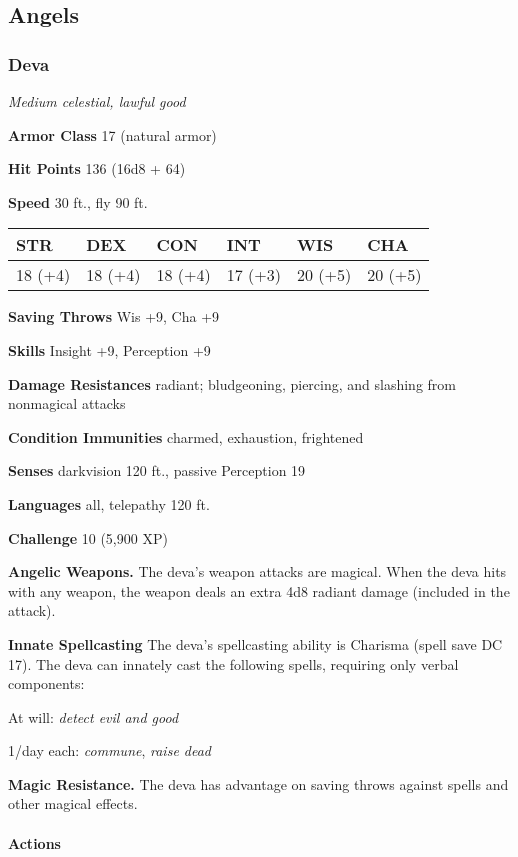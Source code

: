 \documentclass[
]{article}
\begin{document}
\hypertarget{angels}{%
\subsection{Angels}\label{angels}}

\hypertarget{deva}{%
\subsubsection{Deva}\label{deva}}

\emph{Medium celestial, lawful good}

\textbf{Armor Class} 17 (natural armor)

\textbf{Hit Points} 136 (16d8 + 64)

\textbf{Speed} 30 ft., fly 90 ft.

\begin{longtable}[]{@{}llllll@{}}
\toprule
STR & DEX & CON & INT & WIS & CHA\tabularnewline
\midrule
\endhead
18 (+4) & 18 (+4) & 18 (+4) & 17 (+3) & 20 (+5) & 20 (+5)\tabularnewline
\bottomrule
\end{longtable}

\textbf{Saving Throws} Wis +9, Cha +9

\textbf{Skills} Insight +9, Perception +9

\textbf{Damage Resistances} radiant; bludgeoning, piercing, and slashing
from nonmagical attacks

\textbf{Condition Immunities} charmed, exhaustion, frightened

\textbf{Senses} darkvision 120 ft., passive Perception 19

\textbf{Languages} all, telepathy 120 ft.

\textbf{Challenge} 10 (5,900 XP)

\textbf{Angelic Weapons.} The deva's weapon attacks are magical. When
the deva hits with any weapon, the weapon deals an extra 4d8 radiant
damage (included in the attack).

\textbf{Innate Spellcasting} The deva's spellcasting ability is Charisma
(spell save DC 17). The deva can innately cast the following spells,
requiring only verbal components:

At will: \emph{detect evil and good}

1/day each: \emph{commune}, \emph{raise dead}

\textbf{Magic Resistance.} The deva has advantage on saving throws
against spells and other magical effects.

\hypertarget{actions-1}{%
\paragraph{Actions}\label{actions-1}}
\end{document}
